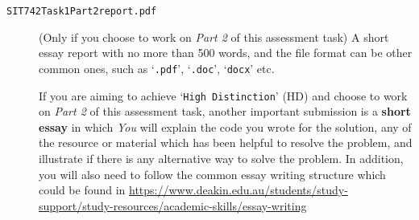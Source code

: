 \documentclass[a4paper]{article}
\begin{document}
\begin{description}
\item[\texttt{SIT742Task1Part2report.pdf}] (Only if you choose to work on \emph{Part 2} of this assessment task)
A short essay report with no more than 500 words,
and the file format can be other common ones,
such as `\texttt{.pdf}', `\texttt{.doc}', `\texttt{docx}' etc.

If you are aiming to achieve `\texttt{High Distinction}' (HD) and choose to work on \emph{Part 2} of this assessment task,
another important submission is a \textbf{short essay} 
in which \emph{You} will explain the code you wrote for the solution,
any of the resource or material which has been helpful 
to resolve the problem, 
and illustrate if there is any alternative way to solve the problem.
In addition, you will also need to follow the common essay writing structure which could be found in \url{https://www.deakin.edu.au/students/study-support/study-resources/academic-skills/essay-writing}

\end{description}

    

     
\end{document}
